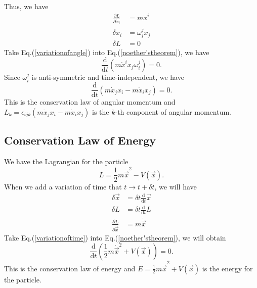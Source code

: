 \documentclass[%
 reprint,
 amsmath,amssymb,
 aps,
]{revtex4-1}
\begin{document}
Thus, we have
\begin{equation}
\begin{aligned}
    \frac{\partial L}{\partial \dot{x}_i}&=m\dot{x}^i
    \\\delta x_i&=\omega_i^jx_j
    \\\delta L&=0
\end{aligned}
\label{variationofangle}
\end{equation}
Take Eq.(\ref{variationofangle}) into Eq.(\ref{noether'stheorem}), we have
\begin{equation}
    \frac{\mathrm{d}}{\mathrm{d}t}(m\dot{x}^ix_j\omega_i^j)=0.
\end{equation}
Since $\omega_i^j$ is anti-symmetric and time-independent, we have
\begin{equation}
    \frac{\mathrm{d}}{\mathrm{d}t}(m\dot{x}_jx_i-m\dot{x}_ix_j)=0.
\end{equation}
This is the conservation law of angular momentum and $L_k=\epsilon_{ijk}(m\dot{x}_jx_i-m\dot{x}_ix_j)$ is the $k$-th conponent of angular momentum.
\subsection{Conservation Law of Energy}
We have the Lagrangian for the particle
\begin{equation}
    L=\frac{1}{2}m\dot{\vec{x}}^2-V(\vec{x}).
\end{equation}
When we add a variation of time that $t\rightarrow t+\delta t$, we will have
\begin{equation}
\begin{aligned}
    \delta\vec{x}&=\delta t\frac{\mathrm{d}}{\mathrm{d}t}\vec{x}
    \\\delta L&=\delta t\frac{\mathrm{d}}{\mathrm{d}t}L
    \\\frac{\partial L}{\partial \dot{\vec{x}}}&=m\dot{\vec{x}}
\end{aligned}
\label{variationoftime}
\end{equation}
Take Eq.(\ref{variationoftime}) into Eq.(\ref{noether'stheorem}), we will obtain
\begin{equation}
    \frac{\mathrm{d}}{\mathrm{d}t}(\frac{1}{2}m\dot{\vec{x}}^2+V(\vec{x}))=0.
\end{equation}
This is the conservation law of energy and $E=\frac{1}{2}m\dot{\vec{x}}^2+V(\vec{x})$ is the energy for the particle.
\end{document}
